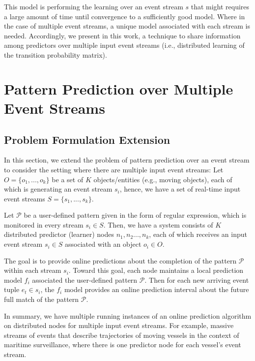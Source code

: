 \par This model is performing the learning over an event stream $s$ that might requires a large amount of time until convergence to a sufficiently good model.  Where in the case of multiple event streams, a unique model associated with each stream is needed. Accordingly, we present in this work, a technique to share information among  \pmcmr predictors over multiple input event streams (i.e., distributed learning of the transition probability matrix).

\section{Pattern Prediction over Multiple Event Streams}

\subsection{Problem Formulation Extension}

\par In this section, we extend the problem of pattern prediction over an event stream to consider the setting where there are multiple input event streams: 
Let $O = \{ o_1, ..., o_k\}$ be a set of \emph{$K$} objects/entities (e.g., moving objects), each of which is generating an event stream $s_i$, hence, we have a set of real-time input event streams $S = \{ s_1, ..., s_k\}$.

\par Let $\mathcal{P}$ be a user-defined pattern given in the form of regular expression, which is monitored in every stream $s_i \in S$. Then, we have a system consists of \emph{$K$} distributed predictor (learner) nodes $n_1,n_2...,n_k$, each of which receives an input event stream $s_i\in S$ associated with an object $o_i \in O$.

\par  The goal is to provide online predictions about the completion of the pattern $\mathcal{P}$ within each stream $s_i$. Toward this goal, each node maintains a local prediction model $f_i$ associated the user-defined pattern $\mathcal{P}$. Then for each new arriving event tuple  $e_t \in s_i$, the $f_i$ model provides an online prediction interval about the future full match of the pattern $\mathcal{P}$.

\par In summary, we have multiple running instances of an online prediction algorithm on distributed nodes for multiple input event streams. For example, massive streams of events that describe trajectories of moving vessels in the context of maritime surveillance, where there is one predictor node for each vessel's event stream.
  
